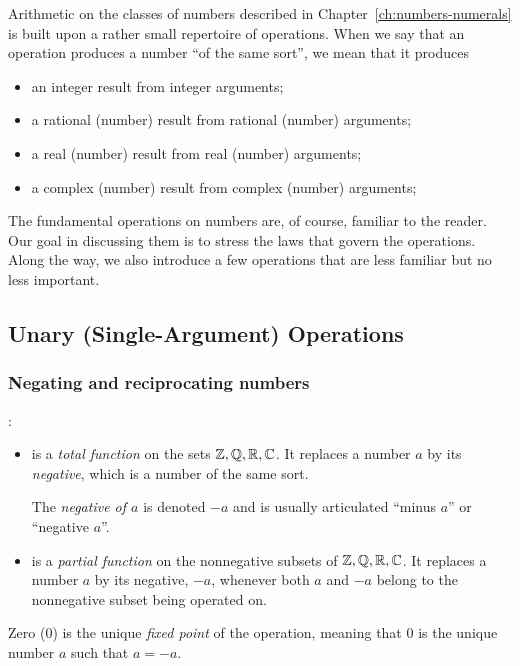 \smallskip

%
Arithmetic on the classes of numbers described in
Chapter~\ref{ch:numbers-numerals} is built upon a rather small
repertoire of operations.  When we say that an operation produces a
number ``of the same sort'', we mean that it produces
\begin{itemize}
\item
an integer result from integer arguments;
\item
a rational (number) result from rational (number) arguments;
\item
a real (number) result from real (number) arguments;
\item
a complex (number) result from complex (number) arguments;
\end{itemize}
The fundamental operations on numbers are, of course, familiar to the
reader.  Our goal in discussing them is to stress the laws that govern
the operations.  Along the way, we also introduce a few operations
that are less familiar but no less important.

\subsection{Unary (Single-Argument) Operations}
\label{sec:unary-ops}


\subsubsection{Negating and reciprocating numbers}

:
\begin{itemize}
\item
is a {\em total function} on the sets $\mathbb{Z}, \mathbb{Q}, \mathbb{R}, \mathbb{C}$.  It replaces
a number $a$ by its {\em negative},
which is a number of the same sort.

The {\it negative of $a$} is denoted $-a$ and is usually articulated
``minus $a$'' or ``negative $a$''.
\item
is a {\em partial function} on the nonnegative subsets
of $\mathbb{Z}, \mathbb{Q}, \mathbb{R}, \mathbb{C}$.  It replaces a number $a$ by its negative, $-a$,
whenever both $a$ and $-a$ belong to the nonnegative subset being
operated on.
\end{itemize}
Zero ($0$) is the unique {\it fixed point} of the operation,
meaning that $0$ is the unique number $a$ such that $a = -a$.

